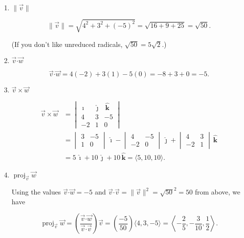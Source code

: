 \documentclass[12pt]{article}
\newcommand{\points}[1]{\marginpar{\hspace{24pt}[#1]}}
\newcommand{\dotp}{\boldsymbol{\cdot}}
\newcommand{\len}[1]{\lVert #1\rVert}
\newcommand{\ivec}{\,\boldsymbol{\hat{\imath}}}
\newcommand{\jvec}{\,\boldsymbol{\hat{\jmath}}}
\newcommand{\kvec}{\,\boldsymbol{\hat{k}}}
\newcommand{\bvm}{\begin{vmatrix}}
\newcommand{\evm}{\end{vmatrix}}
\begin{document}
\begin{enumerate}
\begin{enumerate}
\vspace{0.5in}
  
 \item $\len{\vec{v}}$ \points{2}

\bigskip

\[
 \len{\vec{v}} = \sqrt{4^2+3^2+(-5)^2} = \sqrt{16+9+25} = \sqrt{50}.
\]

(If you don't like unreduced radicals, $\sqrt{50} = 5\sqrt{2}$.)

\vspace{0.5in}

 \item $\vec{v}\dotp\vec{w}$ \points{2}

\bigskip

\[
 \vec{v}\dotp\vec{w} = 4(-2)+3(1)-5(0) = -8+3+0 = -5.
\]

\vspace{0.25in}

 \item $\vec{v}\times \vec{w}$ \points{3}

\bigskip

\begin{align*}
 \vec{v}\times\vec{w} &=\bvm \ivec & \jvec & \kvec\\ 4&3&-5\\-2&1&0\evm\\
& = \bvm 3&-5\\1&0\evm\ivec - \bvm 4&-5\\-2&0\evm\jvec + \bvm 4&3\\-2&1\evm\kvec\\
& = 5\ivec+10\jvec+10\kvec = \langle 5, 10, 10\rangle.
\end{align*}

\vspace{0.5in}

 \item $\operatorname{proj}_{\vec{v}}\vec{w}$ \points{3}

\bigskip

Using the values $\vec{v}\dotp \vec{w} = -5$ and $\vec{v}\dotp \vec{v} = \len{\vec{v}}^2 = \sqrt{50}^2 = 50$ from above, we have

\[
 \operatorname{proj}_{\vec{v}}\vec{w} = \left(\frac{\vec{v}\dotp\vec{w}}{\vec{v}\dotp\vec{v}}\right)\vec{v} = \left(\frac{-5}{50}\right)\langle 4, 3, -5\rangle = \left\langle -\frac{2}{5}, -\frac{3}{10}, \frac{1}{2}\right\rangle.
\]

\end{enumerate}
\newpage




\end{enumerate}
\end{document}
